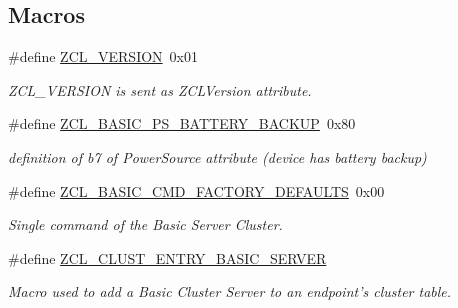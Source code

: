\subsection*{Macros}
\begin{DoxyCompactItemize}
\item 
\#define \hyperlink{group__zcl__basic_ga677e87e13981dedcd3b370ede4902c54}{Z\-C\-L\-\_\-\-V\-E\-R\-S\-I\-O\-N}~0x01
\begin{DoxyCompactList}\small\item\em Z\-C\-L\-\_\-\-V\-E\-R\-S\-I\-O\-N is sent as Z\-C\-L\-Version attribute. \end{DoxyCompactList}\item 
\hypertarget{group__zcl__basic_ga41f5febaea65227af827ca59f30a422b}{\#define \hyperlink{group__zcl__basic_ga41f5febaea65227af827ca59f30a422b}{Z\-C\-L\-\_\-\-B\-A\-S\-I\-C\-\_\-\-P\-S\-\_\-\-B\-A\-T\-T\-E\-R\-Y\-\_\-\-B\-A\-C\-K\-U\-P}~0x80}\label{group__zcl__basic_ga41f5febaea65227af827ca59f30a422b}

\begin{DoxyCompactList}\small\item\em definition of b7 of Power\-Source attribute (device has battery backup) \end{DoxyCompactList}\item 
\hypertarget{group__zcl__basic_ga3b8f5b3fdcb292179c3b8118ee142e07}{\#define \hyperlink{group__zcl__basic_ga3b8f5b3fdcb292179c3b8118ee142e07}{Z\-C\-L\-\_\-\-B\-A\-S\-I\-C\-\_\-\-C\-M\-D\-\_\-\-F\-A\-C\-T\-O\-R\-Y\-\_\-\-D\-E\-F\-A\-U\-L\-T\-S}~0x00}\label{group__zcl__basic_ga3b8f5b3fdcb292179c3b8118ee142e07}

\begin{DoxyCompactList}\small\item\em Single command of the Basic Server Cluster. \end{DoxyCompactList}\item 
\#define \hyperlink{group__zcl__basic_gad8336fcfc2729c8deb86eda7f125f271}{Z\-C\-L\-\_\-\-C\-L\-U\-S\-T\-\_\-\-E\-N\-T\-R\-Y\-\_\-\-B\-A\-S\-I\-C\-\_\-\-S\-E\-R\-V\-E\-R}
\begin{DoxyCompactList}\small\item\em Macro used to add a Basic Cluster Server to an endpoint's cluster table. \end{DoxyCompactList}\end{DoxyCompactItemize}
